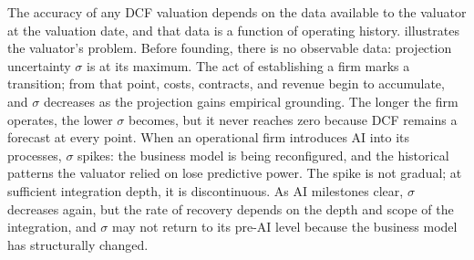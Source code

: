 \documentclass[oneside,10pt]{swissi}
\begin{document}
The accuracy of any DCF valuation depends on the data available to the valuator at the valuation date, and that data is a function of operating history.  illustrates the valuator's problem. Before founding, there is no observable data: projection uncertainty $\sigma$ is at its maximum. The act of establishing a firm marks a transition; from that point, costs, contracts, and revenue begin to accumulate, and $\sigma$ decreases as the projection gains empirical grounding. The longer the firm operates, the lower $\sigma$ becomes, but it never reaches zero because DCF remains a forecast at every point. When an operational firm introduces AI into its processes, $\sigma$ spikes: the business model is being reconfigured, and the historical patterns the valuator relied on lose predictive power. The spike is not gradual; at sufficient integration depth, it is discontinuous. As AI milestones clear, $\sigma$ decreases again, but the rate of recovery depends on the depth and scope of the integration, and $\sigma$ may not return to its pre-AI level because the business model has structurally changed.
\end{document}
